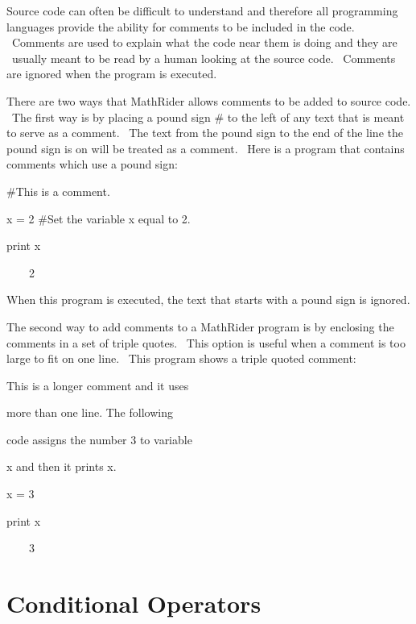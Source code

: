 \documentclass[12pt,twoside]{book}
\begin{document}
Source code can often be difficult to understand and therefore all programming languages provide the ability for comments to be included in the code. \ Comments are used to explain what the code near them is doing and they are \ usually meant to be read by a human looking at the source code. \ Comments are ignored when the program is executed. 

\bigskip

There are two ways that MathRider allows comments to be added to source code. \ The first way is by placing a pound sign {\textquotesingle}\#{\textquotesingle} to the left of any text that is meant to serve as a comment. \ The text from the pound sign to the end of the line the pound sign is on will be treated as a comment. \ Here is a program that contains comments which use a pound sign: 

\bigskip

\#This is a comment.

x = 2 \#Set the variable x equal to 2.

print x

{\textbar}

\ \ \ \ 2


\bigskip

When this program is executed, the text that starts with a pound sign is ignored. 

\bigskip

The second way to add comments to a MathRider program is by enclosing the comments in a set of triple quotes. \ This option is useful when a comment is too large to fit on one line. \ This program shows a triple quoted comment: 

\bigskip

{\textquotedbl}{\textquotedbl}{\textquotedbl}

This is a longer comment and it uses

more than one line. The following

code assigns the number 3 to variable

x and then it prints x.

{\textquotedbl}{\textquotedbl}{\textquotedbl}


\bigskip

x = 3

print x 

{\textbar}

\ \ \ \ 3

\section[Conditional Operators]{Conditional Operators}
\end{document}
